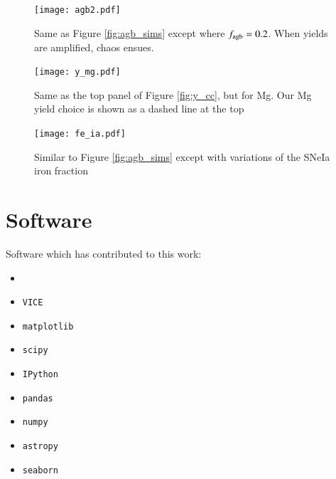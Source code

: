 \documentclass[12pt,oneside]{report}
\newcommand{\VICE}{\texttt{VICE}}
\begin{document}
\begin{figure}[htp]
    \centering
    \texttt{[image: agb2.pdf]}

    \caption[Alternate AGB models]{Same as Figure \ref{fig:agb_sims} except where $f_{\rm agb}=0.2$. When yields are amplified, chaos ensues.}
\end{figure}


\begin{figure}
    \centering
    \texttt{[image: y\_mg.pdf]}
    \caption[Magnesium CCSNe yields]{Same as the top panel of Figure \ref{fig:y_cc}, but for Mg. Our Mg yield choice is shown as a dashed line at the top
    }
\end{figure}

\begin{figure}
    \centering
    \texttt{[image: fe\_ia.pdf]}
    \caption[Adjusting type Ia iron]{Similar to Figure \ref{fig:agb_sims} except with variations of the SNeIa iron fraction}
\end{figure}




\newpage

\section{Software}

Software which has contributed to this work:

\begin{itemize}
    \item \citet{OhioSupercomputerCenter1987}
    \item \VICE~\citep{JW20, james+21}
    \item \texttt{matplotlib} \citep{matplotlib}
    \item \texttt{scipy} \citep{scipy}
    \item \texttt{IPython} \citep{ipy}
    \item \texttt{pandas} \citep{pandas}
    \item \texttt{numpy} \citep{numpy}
    \item \texttt{astropy} \citep{astropy:2013, astropy:2018, astropy:2022}
    \item \texttt{seaborn}
\end{itemize}


\label{lastpage}
\end{document}
